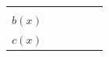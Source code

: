 {{\begin{center}
\begin{tabular}[t]{|l|l|l|l|l|l|}
         &
         &
         &
         &
     \tabularnewline\cline{1-1}\cline{2-2}\cline{3-3}\cline{4-4}\cline{5-5}\cline{6-6}
                  $b\left(x\right)$
                 &
         &
         &
         &
         &
     \tabularnewline\cline{1-1}\cline{2-2}\cline{3-3}\cline{4-4}\cline{5-5}\cline{6-6}
                  $c\left(x\right)$
                 &

\end{tabular}
\end{center}}}
